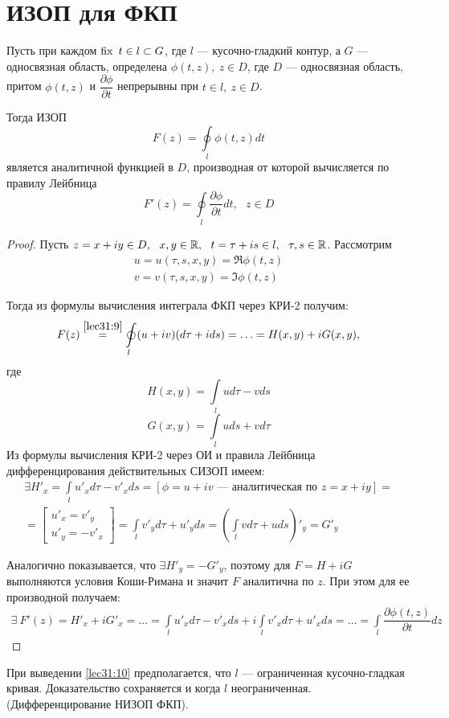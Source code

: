 \documentclass[../../main.tex]{subfiles}
\begin{document}
\section{ИЗОП для ФКП}
\begin{thm}
    Пусть при каждом $\operatorname{fix} \ t \in l \subset G$, где $l$ --- кусочно-гладкий
    контур, а $G$ --- односвязная область, определена $ \phi(t, z), \
    z \in D $, где $D$ --- односвязная область, притом
    $\phi(t, z)$ и $\dfrac{\partial \phi}{\partial t}$ непрерывны при
    $t \in l, \ z \in D$.
    
    Тогда ИЗОП
    \begin{equation}
        \label{lec31:9}
        F(z) = \oint\limits_{l} \phi(t, z) dt
    \end{equation}
    является аналитичной функцией в $D$, производная от которой вычисляется
    по правилу Лейбница
    \begin{equation}
        \label{lec31:10}
        F'(z) = \oint\limits_{l} \dfrac{\partial \phi}{\partial t} dt,
        \ \ \ z \in D
    \end{equation}
\end{thm}
\begin{proof}
    Пусть $z = x + i y \in D, \ \ x, y \in \R, \ \ t = \tau + i s \in l,
    \ \ \tau, s \in \R$. Рассмотрим \[ \begin{gathered}
    u = u(\tau, s, x, y) = \Re \phi(t, z) \\
    v = v(\tau, s, x, y) = \Im \phi(t, z)
    \end{gathered} \]

    Тогда из формулы вычисления интеграла ФКП через КРИ-2 получим:
    \[ F(z) \stackrel{\eqref{lec31:9}}{=} \oint\limits_{l} (u + i v)
    (d \tau + i d s) = \ldots = H(x, y) + i G(x, y),\]
    где
    \[ H(x, y) = \int\limits_{l} u d \tau - v d s \]
    \[ G(x, y) = \int\limits_{l} u d s + v d \tau \]
    Из формулы вычисления КРИ-2 через ОИ и правила Лейбница
    дифференцирования действительных СИЗОП имеем:
    \[ \begin{gathered} 
        \exists H'_x = \int\limits_{l} u'_x d \tau - v'_x d s =
        [ \phi = u + i v \text{ \ --- аналитическая по \ } z = x + i y ]
        = \\ =
        \left[\begin{gathered}
            u'_x = v'_y \\
            u'_y = - v'_x
        \end{gathered}\right] =
        \int\limits_{l} v'_y d \tau + u'_y d s =
        \left(\int\limits_{l} v d \tau + u d s\right)'_y = G'_y
    \end{gathered} \]

    Аналогично показывается, что $\exists H'_y = -G'_y$, поэтому для
    $ F = H + i G $
    выполняются условия Коши-Римана и значит $F$ аналитична по $z$.
    При этом для ее производной получаем:
    \[\begin{gathered}
        \exists \ F'(z) = H'_x + i G'_x = \ldots =
        \int\limits_{l} u'_x d \tau - v'_x d s + 
        i \int\limits_{l} v'_x d \tau + u'_x d s = \ldots =
        \int\limits_{l} \dfrac{\partial \phi (t, z)}{\partial t} d z
    \end{gathered}\] 
\end{proof}
\begin{rem}
    При выведении \eqref{lec31:10} предполагается, что $l$ ---
    ограниченная кусочно-гладкая кривая. Доказательство сохраняется
    и когда $l$ неограниченная. (Дифференцирование НИЗОП ФКП).
\end{rem}
\end{document}
